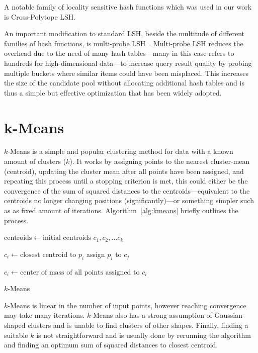 A notable family of locality sensitive hash functions which was used in our work is
Cross-Polytope LSH. %

An important modification to standard LSH, beside the multitude of different
families of hash functions, is multi-probe LSH~\cite{multiprobelsh}. Multi-probe
LSH reduces the overhead due to the need of many hash tables---many in this
case refers to hundreds for high-dimensional data---to increase query result
quality by probing multiple buckets where similar items could have been
misplaced. This increases the size of the candidate pool without allocating
additional hash tables and is thus a simple but effective optimization that has
been widely adopted.

\section{k-Means}

$k$-Means is a simple and popular clustering method for data with a known
amount of clusters ($k$). It works by assigning points to the nearest
cluster-mean (centroid), updating the cluster mean after all points have been
assigned, and repeating this process until a stopping criterion is met,
this could either be the convergence of the sum of squared distances to the centroids---equivalent
to the centroids no longer changing positions (significantly)---or something simpler such as as fixed amount of iterations. Algorithm~\ref{alg:kmeans}
briefly outlines the process.

\begin{algorithm}[tb]
    \begin{algorithmic}
      \State $\text{centroids} \gets \text{initial centroids } c_1, c_2, \ldots c_k$

          \State $c_i \gets \text{closest centroid to } p_i$
          \State assign $p_i$ to $c_j$
        \EndFor

          \State $c_i \gets \text{center of mass of all points assigned to } c_i$
        \EndFor
      \EndWhile
      \EndProcedure
    \end{algorithmic}
    \caption{$k$-Means}
    \label{alg:kmeans}
\end{algorithm}

$k$-Means is linear in the number of input points, however reaching convergence
may take many iterations. $k$-Means also has a strong assumption of
Gaussian-shaped clusters and is unable to find clusters of other shapes.
Finally, finding a suitable $k$ is not straightforward and is usually done by
rerunning the algorithm and finding an optimum sum of squared distances to closest
centroid.

